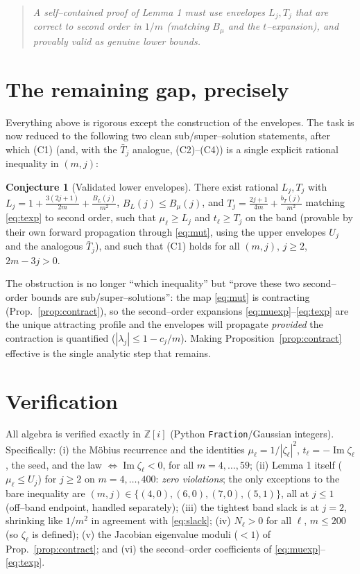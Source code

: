\documentclass[11pt]{article}
\theoremstyle{definition}
\newtheorem{conjecture}{Conjecture}
\newcommand{\Z}{\mathbb{Z}}
\newcommand{\Im}{\operatorname{Im}}
\begin{document}
\begin{quote}\itshape
A self--contained proof of Lemma 1 must use envelopes $L_j,T_j$ that are correct
to \emph{second order} in $1/m$ (matching $B_\mu$ and the $t$--expansion),
\emph{and} provably valid as genuine lower bounds.
\end{quote}

\section{The remaining gap, precisely}

Everything above is rigorous except the construction of the envelopes. The task
is now reduced to the following two clean sub/super--solution statements, after
which (C1) (and, with the $\bar T_j$ analogue, (C2)--(C4)) is a single explicit
rational inequality in $(m,j)$:
\begin{conjecture}[Validated lower envelopes]
There exist rational $L_j,T_j$ with
$L_j=1+\frac{3(2j+1)}{2m}+\frac{B_L(j)}{m^2}$, $B_L(j)\le B_\mu(j)$, and
$T_j=\frac{2j+1}{4m}+\frac{b_T(j)}{m^2}$ matching \eqref{eq:texp} to second order,
such that $\mu_\ell\ge L_j$ and $t_\ell\ge T_j$ on the band (provable by their own
forward propagation through \eqref{eq:mut}, using the upper envelopes $U_j$ and
the analogous $\bar T_j$), and such that (C1) holds for all $(m,j)$, $j\ge2$,
$2m-3j>0$.
\end{conjecture}
The obstruction is no longer ``which inequality'' but ``prove these two
second--order bounds are sub/super--solutions'': the map \eqref{eq:mut} is
contracting (Prop.~\ref{prop:contract}), so the second--order expansions
\eqref{eq:muexp}--\eqref{eq:texp} are the unique attracting profile and the
envelopes will propagate \emph{provided} the contraction is quantified
($|\lambda_j|\le1-c_j/m$). Making Proposition~\ref{prop:contract} effective is
the single analytic step that remains.

\section{Verification}

All algebra is verified exactly in $\Z[i]$ (Python \texttt{Fraction}/Gaussian
integers). Specifically: (i) the M\"obius recurrence and the identities
$\mu_\ell=1/|\zeta_\ell|^2$, $t_\ell=-\Im\zeta_\ell$, the seed, and the law
$\iff\Im\zeta_\ell<0$, for all $m=4,\dots,59$; (ii) Lemma 1 itself
($\mu_\ell\le U_j$) for $j\ge2$ on $m=4,\dots,400$: \emph{zero violations}; the
only exceptions to the bare inequality are $(m,j)\in\{(4,0),(6,0),(7,0),(5,1)\}$,
all at $j\le1$ (off--band endpoint, handled separately); (iii) the tightest band
slack is at $j=2$, shrinking like $1/m^2$ in agreement with \eqref{eq:slack};
(iv) $N_\ell>0$ for all $\ell$, $m\le200$ (so $\zeta_\ell$ is defined);
(v) the Jacobian eigenvalue moduli ($<1$) of Prop.~\ref{prop:contract}; and
(vi) the second--order coefficients of \eqref{eq:muexp}--\eqref{eq:texp}.
\end{document}
